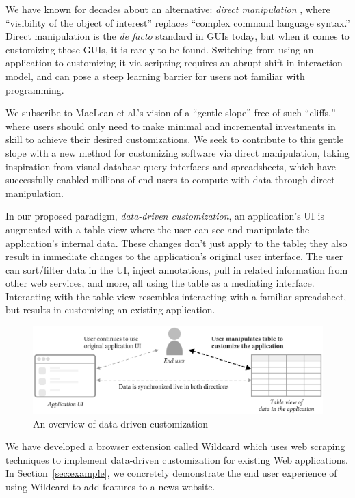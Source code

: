 \documentclass[sigplan,screen,10pt,anonymous,review]{acmart}
\begin{document}
We have known for decades about an alternative: \emph{direct
manipulation} \citep{shneiderman1983}, where ``visibility of the object
of interest'' replaces ``complex command language syntax.'' Direct
manipulation is the \emph{de facto} standard in GUIs today, but when it
comes to customizing those GUIs, it is rarely to be found. Switching
from using an application to customizing it via scripting requires an
abrupt shift in interaction model, and can pose a steep learning barrier
for users not familiar with programming.

We subscribe to MacLean et al.'s vision of a ``gentle slope''
\citep{maclean1990} free of such ``cliffs,'' where users should only
need to make minimal and incremental investments in skill to achieve
their desired customizations. We seek to contribute to this gentle slope
with a new method for customizing software via direct manipulation,
taking inspiration from visual database query interfaces and
spreadsheets, which have successfully enabled millions of end users to
compute with data through direct manipulation.

In our proposed paradigm, \emph{data-driven customization}, an
application's UI is augmented with a table view where the user can see
and manipulate the application's internal data. These changes don't just
apply to the table; they also result in immediate changes to the
application's original user interface. The user can sort/filter data in
the UI, inject annotations, pull in related information from other web
services, and more, all using the table as a mediating interface.
Interacting with the table view resembles interacting with a familiar
spreadsheet, but results in customizing an existing application.

\begin{figure}
\hypertarget{fig:overview}{%
\centering
\includegraphics[width=\textwidth]{media/overview.eps}
\caption{An overview of data-driven customization}\label{fig:overview}
}
\end{figure}

We have developed a browser extension called Wildcard which uses web
scraping techniques to implement data-driven customization for existing
Web applications. In Section~\ref{sec:example}, we concretely
demonstrate the end user experience of using Wildcard to add features to
a news website.
\end{document}

